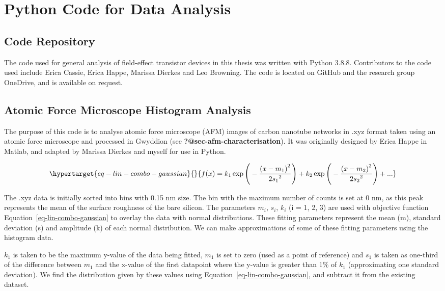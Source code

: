 \documentclass[
  a4paper,
]{scrbook}
\begin{document}
\hypertarget{sec-python}{%
\chapter{Python Code for Data Analysis}\label{sec-python}}

\hypertarget{code-repository}{%
\section{Code Repository}\label{code-repository}}

The code used for general analysis of field-effect transistor devices in
this thesis was written with Python 3.8.8. Contributors to the code used
include Erica Cassie, Erica Happe, Marissa Dierkes and Leo Browning. The
code is located on GitHub and the research group OneDrive, and is
available on request.

\hypertarget{sec-histogram-analysis}{%
\section{Atomic Force Microscope Histogram
Analysis}\label{sec-histogram-analysis}}

The purpose of this code is to analyse atomic force microscope (AFM)
images of carbon nanotube networks in .xyz format taken using an atomic
force microscope and processed in Gwyddion (see
\textbf{?@sec-afm-characterisation}). It was originally designed by
Erica Happe in Matlab, and adapted by Marissa Dierkes and myself for use
in Python.

\begin{equation}\protect\hypertarget{eq-lin-combo-gaussian}{}{
f(x) = k_1\exp{\Bigg(-\frac{{(x-m_1)}^{2}}{{2s_1}^{2}}\Bigg)} + k_2\exp{\Bigg(-\frac{{(x-m_2)}^{2}}{{2s_2}^{2}}\Bigg)} + ...
}\label{eq-lin-combo-gaussian}\end{equation}

The .xyz data is initially sorted into bins with 0.15 nm size. The bin
with the maximum number of counts is set at 0 nm, as this peak
represents the mean of the surface roughness of the bare silicon. The
parameters \(m_i\), \(s_i\), \(k_i\) (i = 1, 2, 3) are used with
objective function Equation~\ref{eq-lin-combo-gaussian} to overlay the
data with normal distributions. These fitting parameters represent the
mean (m), standard deviation (s) and amplitude (k) of each normal
distribution. We can make approximations of some of these fitting
parameters using the histogram data.

\(k_1\) is taken to be the maximum y-value of the data being fitted,
\(m_1\) is set to zero (used as a point of reference) and \(s_1\) is
taken as one-third of the difference between \(m_1\) and the x-value of
the first datapoint where the y-value is greater than 1\% of \(k_1\)
(approximating one standard deviation). We find the distribution given
by these values using Equation~\ref{eq-lin-combo-gaussian}, and subtract
it from the existing dataset.
\end{document}
